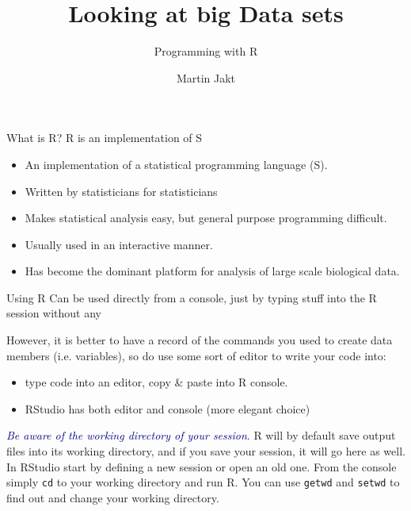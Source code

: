 \documentclass[pdf]{beamer}
\title{Looking at big Data sets}
\subtitle{Programming with R}
\author{Martin Jakt}
\begin{document}
\begin{frame}
\titlepage
\end{frame}

\begin{frame}{What is R?}
  \pause
  R is an implementation of S
  \pause
  
  {\small
  \begin{itemize}
  \item An implementation of a statistical programming language (S).
  \item Written by statisticians for statisticians
  \item Makes statistical analysis easy, but general purpose programming difficult.
  \item Usually used in an interactive manner.
  \item Has become the dominant platform for analysis of large scale biological data.
  \end{itemize}
  }
\end{frame}

\begin{frame}{Using R}
  Can be used directly from a console, just by typing stuff into the
  R session without any 

  However, it is better to have a record of the commands you used to create
  data members (i.e. variables), so do use some sort of editor to write your code
  into:
  \begin{itemize}
  \item type code into an editor, copy \& paste into R console.\\
  \item RStudio has both editor and console (more elegant choice)
  \end{itemize}

  \textcolor{navy}{\emph{Be aware of the working directory of your session}}. R will by default save
  output files into its working directory, and if you save your session, it will go
  here as well. In RStudio start by defining a new session or open an old one. From
  the console simply \texttt{cd} to your working directory and run R. You can use
  \texttt{getwd} and \texttt{setwd} to find out and change your working directory.

\end{frame}
\end{document}
